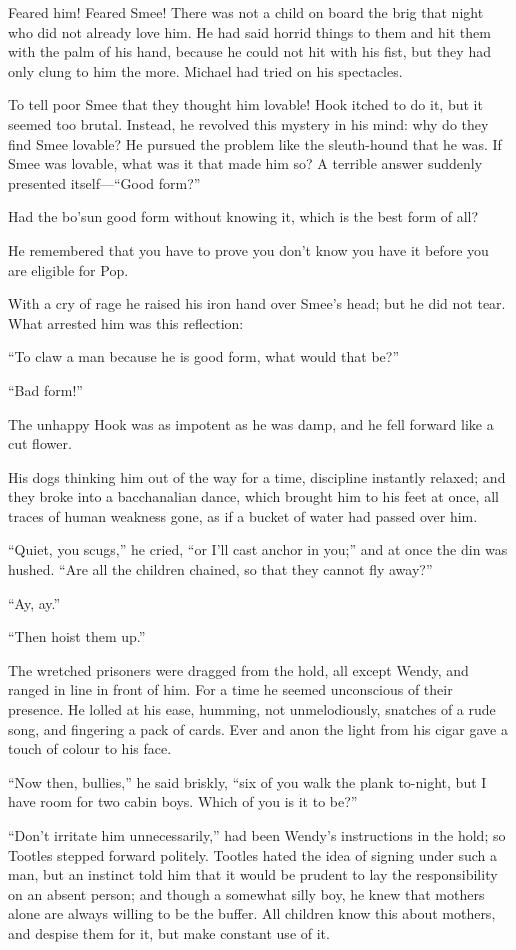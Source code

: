Feared him! Feared Smee! There was not a child on board the brig that
night who did not already love him. He had said horrid things to them
and hit them with the palm of his hand, because he could not hit with
his fist, but they had only clung to him the more. Michael had tried on
his spectacles.

To tell poor Smee that they thought him lovable! Hook itched to do it,
but it seemed too brutal. Instead, he revolved this mystery in his
mind: why do they find Smee lovable? He pursued the problem like the
sleuth-hound that he was. If Smee was lovable, what was it that made
him so? A terrible answer suddenly presented itself---``Good form?''

Had the bo'sun good form without knowing it, which is the best form of
all?

He remembered that you have to prove you don't know you have it before
you are eligible for Pop.

With a cry of rage he raised his iron hand over Smee's head; but he did
not tear. What arrested him was this reflection:

``To claw a man because he is good form, what would that be?''

``Bad form!''

The unhappy Hook was as impotent as he was damp, and he fell forward
like a cut flower.

His dogs thinking him out of the way for a time, discipline instantly
relaxed; and they broke into a bacchanalian dance, which brought him to
his feet at once, all traces of human weakness gone, as if a bucket of
water had passed over him.

``Quiet, you scugs,'' he cried, ``or I'll cast anchor in you;'' and at once
the din was hushed. ``Are all the children chained, so that they cannot
fly away?''

``Ay, ay.''

``Then hoist them up.''

The wretched prisoners were dragged from the hold, all except Wendy,
and ranged in line in front of him. For a time he seemed unconscious of
their presence. He lolled at his ease, humming, not unmelodiously,
snatches of a rude song, and fingering a pack of cards. Ever and anon
the light from his cigar gave a touch of colour to his face.

``Now then, bullies,'' he said briskly, ``six of you walk the plank
to-night, but I have room for two cabin boys. Which of you is it to
be?''

``Don't irritate him unnecessarily,'' had been Wendy's instructions in
the hold; so Tootles stepped forward politely. Tootles hated the idea
of signing under such a man, but an instinct told him that it would be
prudent to lay the responsibility on an absent person; and though a
somewhat silly boy, he knew that mothers alone are always willing to be
the buffer. All children know this about mothers, and despise them for
it, but make constant use of it.


